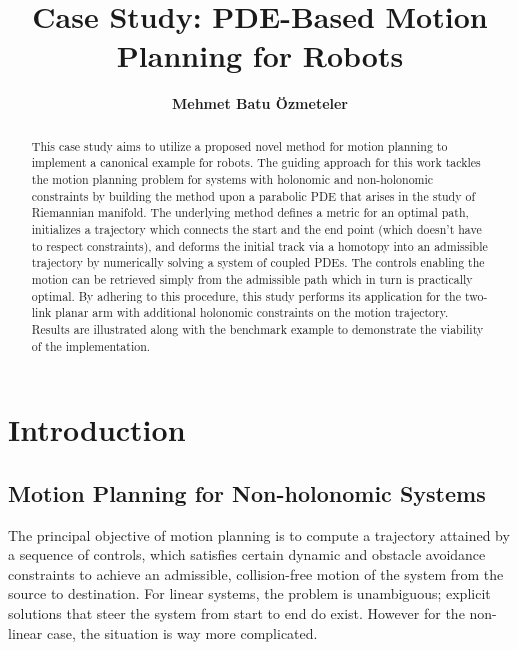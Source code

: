 \documentclass[letterpaper, 10 pt, conference]{ieeeconf}
\title{\LARGE \bf
Case Study: PDE-Based Motion Planning for Robots
}
\author{ \textbf{Mehmet Batu Özmeteler} \\
\institute{Technische Universität Dortmund, Germany}}
\begin{document}
\maketitle

\begin{abstract}

This case study aims to utilize a proposed novel method for motion planning to implement
a canonical example for robots. The guiding approach for this work tackles the motion planning 
problem for systems with holonomic and non-holonomic constraints by building the method upon a  parabolic PDE that arises in the study of Riemannian manifold. The underlying method defines a metric for an optimal path, initializes a trajectory which connects the start and the end point (which doesn't have to respect constraints), and deforms the initial track via a homotopy into an admissible trajectory by numerically solving a system of coupled PDEs. The controls enabling the motion can be retrieved simply from the admissible path which in turn is practically optimal. By adhering to this procedure, this study performs its application for the two-link planar arm with additional holonomic constraints on the motion trajectory. Results are illustrated along with the benchmark example to demonstrate the viability of the implementation.

\end{abstract}

\section{\textbf{Introduction}}

\subsection{Motion Planning for Non-holonomic Systems}

The principal objective of motion planning is to compute a trajectory attained by a sequence of controls, which satisfies certain dynamic and obstacle avoidance constraints to achieve an admissible, collision-free motion of the system from the source to destination. For linear systems, the problem is unambiguous; explicit solutions that steer the system from start to end do exist. However for the non-linear case, the situation is way more complicated.
\end{document}
